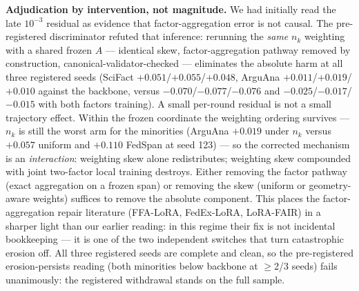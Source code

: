 \documentclass[sigconf,anonymous,review]{acmart}
\begin{document}
\textbf{Adjudication by intervention, not magnitude.} We had initially read the late $10^{-3}$ residual as evidence that factor-aggregation error is not causal. The pre-registered discriminator refuted that inference: rerunning the \emph{same} $n_k$ weighting with a shared frozen $A$ --- identical skew, factor-aggregation pathway removed by construction, canonical-validator-checked --- eliminates the absolute harm at all three registered seeds (SciFact $+0.051$/$+0.055$/$+0.048$, ArguAna $+0.011$/$+0.019$/$+0.010$ against the backbone, versus $-0.070$/$-0.077$/$-0.076$ and $-0.025$/$-0.017$/$-0.015$ with both factors training). A small per-round residual is not a small trajectory effect. Within the frozen coordinate the weighting ordering survives --- $n_k$ is still the worst arm for the minorities (ArguAna $+0.019$ under $n_k$ versus $+0.057$ uniform and $+0.110$ FedSpan at seed 123) --- so the corrected mechanism is an \emph{interaction}: weighting skew alone redistributes; weighting skew compounded with joint two-factor local training destroys. Either removing the factor pathway (exact aggregation on a frozen span) or removing the skew (uniform or geometry-aware weights) suffices to remove the absolute component. This places the factor-aggregation repair literature (FFA-LoRA, FedEx-LoRA, LoRA-FAIR) in a sharper light than our earlier reading: in this regime their fix is not incidental bookkeeping --- it is one of the two independent switches that turn catastrophic erosion off. All three registered seeds are complete and clean, so the pre-registered erosion-persists reading (both minorities below backbone at $\geq$2/3 seeds) fails unanimously: the registered withdrawal stands on the full sample.
\end{document}
